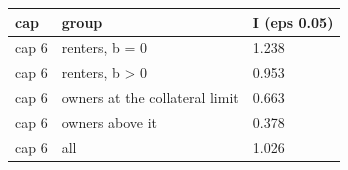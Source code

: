\begingroup\small
\setlength{\tabcolsep}{3pt}
\renewcommand{\arraystretch}{1.04}
\begin{tabularx}{\linewidth}{XXX}
\toprule
cap & group & I (eps 0.05) \\
\midrule
cap 6 & renters, b = 0 & 1.238 \\
cap 6 & renters, b \textgreater{} 0 & 0.953 \\
cap 6 & owners at the collateral limit & 0.663 \\
cap 6 & owners above it & 0.378 \\
cap 6 & all & 1.026 \\
\bottomrule
\end{tabularx}
\endgroup
